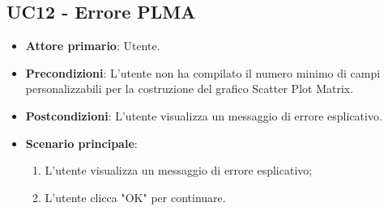 \subsection{UC12 - Errore PLMA}
\begin{itemize}
	\item \textbf{Attore primario}: Utente.
	\item \textbf{Precondizioni}: L'utente non ha compilato il numero minimo di campi personalizzabili per la costruzione del grafico Scatter Plot Matrix.
	\item \textbf{Postcondizioni}: L'utente visualizza un messaggio di errore esplicativo.
	\item \textbf{Scenario principale}:
		\begin{enumerate}
			\item L'utente visualizza un messaggio di errore esplicativo;
			\item L'utente clicca "OK" per continuare.
		\end{enumerate}
\end{itemize}